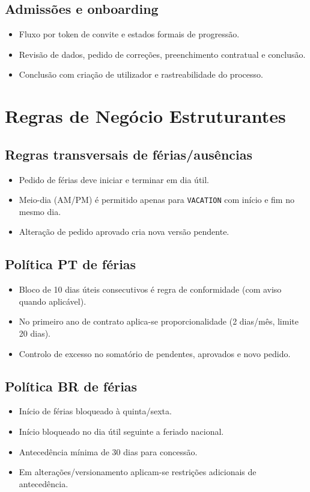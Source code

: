 \documentclass[11pt,a4paper,twoside]{article}
\begin{document}
\subsection{Admissões e onboarding}
\begin{itemize}
  \item Fluxo por token de convite e estados formais de progressão.
  \item Revisão de dados, pedido de correções, preenchimento contratual e conclusão.
  \item Conclusão com criação de utilizador e rastreabilidade do processo.
\end{itemize}

\section{Regras de Negócio Estruturantes}

\subsection{Regras transversais de férias/ausências}
\begin{itemize}
  \item Pedido de férias deve iniciar e terminar em dia útil.
  \item Meio-dia (AM/PM) é permitido apenas para \texttt{VACATION} com início e fim no mesmo dia.
  \item Alteração de pedido aprovado cria nova versão pendente.
\end{itemize}

\subsection{Política PT de férias}
\begin{itemize}
  \item Bloco de 10 dias úteis consecutivos é regra de conformidade (com aviso quando aplicável).
  \item No primeiro ano de contrato aplica-se proporcionalidade (2 dias/mês, limite 20 dias).
  \item Controlo de excesso no somatório de pendentes, aprovados e novo pedido.
\end{itemize}

\subsection{Política BR de férias}
\begin{itemize}
  \item Início de férias bloqueado à quinta/sexta.
  \item Início bloqueado no dia útil seguinte a feriado nacional.
  \item Antecedência mínima de 30 dias para concessão.
  \item Em alterações/versionamento aplicam-se restrições adicionais de antecedência.
\end{itemize}
\end{document}
